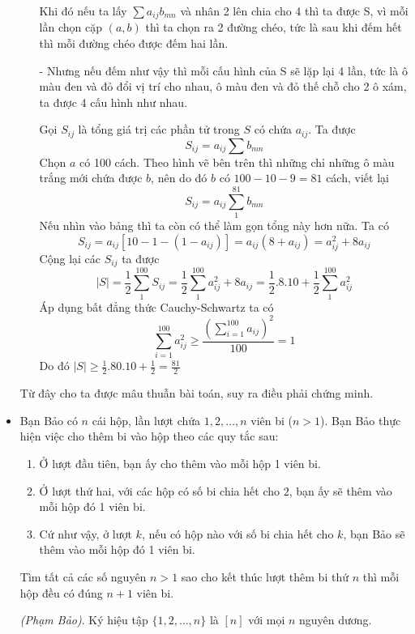 \documentclass[11pt]{scrartcl}
\begin{document}
\begin{itemize}[label=, leftmargin=0em, itemsep=0.5em]
\begin{sol}
\begin{itemize}[label=,leftmargin=0em]
        Khi đó nếu ta lấy $\sum a_{ij}b_{mn}$ và nhân 2 lên chia cho 4 thì ta được S, vì mỗi lần chọn cặp $(a,b)$ thì ta chọn ra 2 đường chéo, tức là sau khi đếm hết thì mỗi đường chéo được đếm hai lần. 
    
        - Nhưng nếu đếm như vậy thì mỗi cấu hình của S sẽ lặp lại 4 lần, tức là ô màu đen và đỏ đổi vị trí cho nhau, ô màu đen và đỏ thế chỗ cho 2 ô xám, ta được 4 cấu hình như nhau.
    
        Gọi $S_{ij}$ là tổng giá trị các phần tử trong $S$ có chứa $a_{ij}$. Ta được $$S_{ij} = a_{ij} \sum b_{mn}$$
        Chọn $a$ có 100 cách. Theo hình vẽ bên trên thì những chỉ những ô màu trắng mới chứa được $b$, nên do đó $b$ có $100 - 10 - 9 = 81$ cách, viết lại 
        $$ S_{ij} = a_{ij}\sum_{1}^{81} b_{mn}
        $$
        Nếu nhìn vào bảng thì ta còn có thể làm gọn tổng này hơn nữa. Ta có
        $$ S_{ij} = a_{ij}[10 - 1 - (1 - a_{ij}) ]
        = a_{ij}(8 + a_{ij})
        = a_{ij}^2 + 8a_{ij}
        $$
        Cộng lại các $S_{ij}$ ta được
        $$ |S| = \frac{1}{2}\sum_{1}^{100} S_{ij} =\frac{1}{2} \sum_{1}^{100} a_{ij}^2 + 8a_{ij} =  \frac{1}{2}.8.10 + \frac{1}{2}\sum_{1}^{100} a_{ij}^2  
        $$
        Áp dụng bất đẳng thức Cauchy-Schwartz ta có 
        $$ \sum_{i=1}^{100} a_{ij}^2 \geq \frac{ \left(\displaystyle \sum_{i=1}^{100}a_{ij}\right)^2}{100} = 1
        $$
        Do đó $|S| \geq \frac{1}{2}.80.10 + \frac{1}{2} = \frac{81}{2}$
    \end{itemize}
    Từ đây cho ta được mâu thuẫn bài toán, suy ra điều phải chứng minh.
    \end{sol}

    \item \begin{bt}
        Bạn Bảo có $n$ cái hộp, lần lượt chứa $1,2,\dots,n$ viên bi ($n > 1$). Bạn Bảo thực hiện việc cho thêm bi vào hộp theo các quy tắc sau:
        \begin{enumerate}
            \item Ở lượt đầu tiên, bạn ấy cho thêm vào mỗi hộp 1 viên bi.
            \item Ở lượt thứ hai, với các hộp có số bi chia hết cho $2$, bạn ấy sẽ thêm vào mỗi hộp đó 1 viên bi.
            \item Cứ như vậy, ở lượt $k$, nếu có hộp nào với số bi chia hết cho $k$, bạn Bảo sẽ thêm vào mỗi hộp đó 1 viên bi.
        \end{enumerate}
        Tìm tất cả các số nguyên $n > 1$ sao cho kết thúc lượt thêm bi thứ $n$ thì mỗi hộp đều có đúng $n + 1$ viên bi.
    \end{bt}
    \begin{sol}
        \textit{(Phạm Bảo)}. Ký hiệu tập $\{1,2,\dots, n\}$ là $[n]$ với mọi $n$ nguyên dương.


\end{sol}
\end{itemize}
\end{document}
